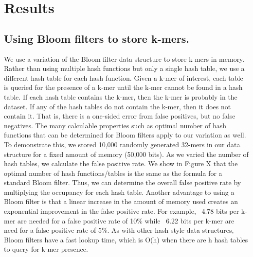 \documentclass[12pt]{article} \usepackage{simplemargins}
\begin{document}
\section{Results}

\subsection{Using Bloom filters to store k-mers.}

We use a variation of the Bloom filter data structure to store k-mers
in memory. Rather than using multiple hash functions but only a single
hash table, we use a different hash table for each hash
function. Given a k-mer of interest, each table is queried for the
presence of a k-mer until the k-mer cannot be found in a hash
table. If each hash table contains the k-mer, then the k-mer is
probably in the dataset. If any of the hash tables do not contain the
k-mer, then it does not contain it. That is, there is a one-sided
error from false positives, but no false negatives. The many
calculable properties such as optimal number of hash functions that
can be determined for Bloom filters apply to our variation as well. To
demonstrate this, we stored 10,000 randomly generated 32-mers in our
data structure for a fixed amount of memory (50,000 bits). As we
varied the number of hash tables, we calculate the false positive
rate. We show in Figure X that the optimal number of hash
functions/tables is the same as the formula for a standard Bloom
filter. Thus, we can determine the overall false positive rate by
multiplying the occupancy for each hash table. Another advantage to
using a Bloom filter is that a linear increase in the amount of memory
used creates an exponential improvement in the false positive
rate. For example, ~4.78 bits per k-mer are needed for a false
positive rate of 10\% while ~6.22 bits per k-mer are need for a false
positive rate of
5\%. As with other hash-style data structures, Bloom filters have a
fast lookup time, which is O(h) when there are h hash tables to query
for k-mer presence.
\end{document}
